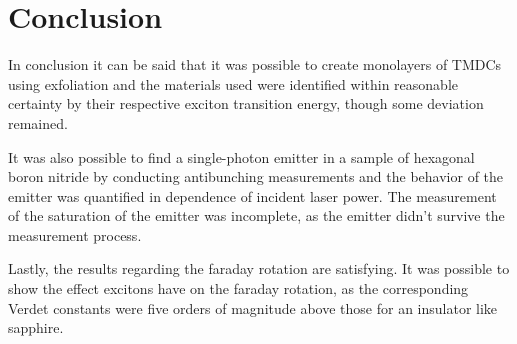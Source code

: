 \newpage
\section{Conclusion}


  In conclusion it can be said that it was possible to create monolayers of TMDCs using exfoliation and the materials used were identified within reasonable certainty by their respective exciton transition energy, though some deviation remained.

  It was also possible to find a single-photon emitter in a sample of hexagonal boron nitride by conducting antibunching measurements and the behavior of the emitter was quantified in dependence of incident laser power.
  The measurement of the saturation of the emitter was incomplete, as the emitter didn't survive the measurement process.

  Lastly, the results regarding the faraday rotation are satisfying. It was possible to show the effect excitons have on the faraday rotation, as the corresponding Verdet constants were five orders of magnitude above those for an insulator like sapphire.
